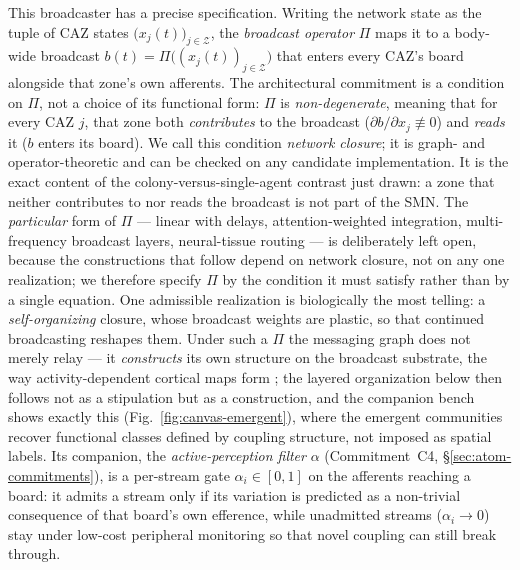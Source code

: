 \documentclass{article}
\begin{document}
This broadcaster has a precise specification.  Writing the network state as
the tuple of CAZ states $\big(x_j(t)\big)_{j\in\mathcal{Z}}$, the
\emph{broadcast operator} $\Pi$ maps it to a body-wide broadcast
$b(t)=\Pi\big((x_j(t))_{j\in\mathcal{Z}}\big)$ that enters every CAZ's board
alongside that zone's own afferents.  The architectural commitment is a
condition on $\Pi$, not a choice of its functional form: $\Pi$ is
\emph{non-degenerate}, meaning that for every CAZ $j$, that zone both
\emph{contributes} to the broadcast ($\partial b/\partial x_j\not\equiv 0$)
and \emph{reads} it ($b$ enters its board).  We call this condition
\emph{network closure}; it is graph- and operator-theoretic and can be
checked on any candidate implementation.  It is the exact content of the
colony-versus-single-agent contrast just drawn: a zone that neither
contributes to nor reads the broadcast is not part of the SMN.  The
\emph{particular} form of $\Pi$ --- linear with delays, attention-weighted
integration, multi-frequency broadcast layers, neural-tissue routing --- is
deliberately left open, because the constructions that follow depend on
network closure, not on any one realization; we therefore specify $\Pi$ by
the condition it must satisfy rather than by a single equation.  One
admissible realization is biologically the most telling: a \emph{self-organizing}
closure, whose broadcast weights are plastic, so that continued broadcasting
reshapes them.  Under such a $\Pi$ the messaging graph does not merely relay ---
it \emph{constructs} its own structure on the broadcast substrate, the way
activity-dependent cortical maps form \citep{Kohonen1982SOM}; the layered
organization below then follows not as a stipulation but as a construction, and
the companion bench shows exactly this (Fig.~\ref{fig:canvas-emergent}), where the
emergent communities recover functional classes defined by coupling structure, not
imposed as spatial labels.  Its
companion, the \emph{active-perception filter} $\alpha$ (Commitment~C4,
\S\ref{sec:atom-commitments}), is a per-stream gate $\alpha_i\in[0,1]$ on the
afferents reaching a board: it admits a stream only if its variation is predicted
as a non-trivial consequence of that board's own efference, while unadmitted
streams ($\alpha_i\!\to\!0$) stay under low-cost peripheral monitoring so that
novel coupling can still break through.
\end{document}
